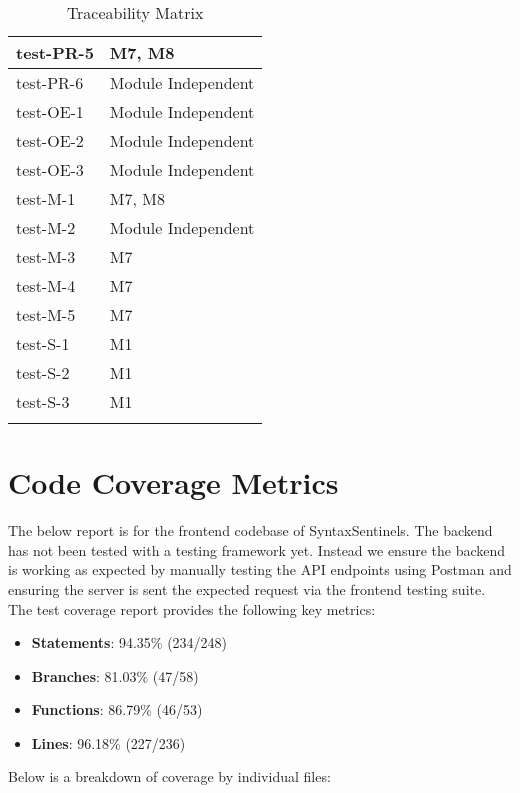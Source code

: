 \documentclass[12pt, titlepage]{article}
\begin{document}
\begin{center}
\begin{longtable}{|>{\centering\arraybackslash}p{4cm}|>{\centering\arraybackslash}p{10cm}|}
    test-PR-5 &  M7, M8\\
    \hline
    test-PR-6 &  Module Independent\\
    \hline
    test-OE-1 & Module Independent\\
    \hline
    test-OE-2 & Module Independent\\
    \hline
    test-OE-3 & Module Independent\\
    \hline
    test-M-1 & M7, M8 \\
    \hline
    test-M-2 & Module Independent\\
    \hline
    test-M-3 & M7 \\
    \hline
    test-M-4 & M7 \\
    \hline
    test-M-5 & M7 \\
    \hline
    test-S-1 & M1 \\
    \hline
    test-S-2 & M1 \\
    \hline
    test-S-3 & M1 \\
    \hline
  
    \caption{Traceability Matrix}
    \end{longtable}
    \end{center}

\section{Code Coverage Metrics}

The below report is for the frontend codebase of SyntaxSentinels. The backend has not been tested with a testing framework yet.
Instead we ensure the backend is working as expected by manually testing the API endpoints using Postman and ensuring the server is sent the 
expected request via the frontend testing suite. \\

The test coverage report provides the following key metrics:

\begin{itemize}
\item \textbf{Statements}: 94.35\% (234/248)
\item \textbf{Branches}: 81.03\% (47/58)
\item \textbf{Functions}: 86.79\% (46/53)
\item \textbf{Lines}: 96.18\% (227/236)
\end{itemize}

\newpage

Below is a breakdown of coverage by individual files:
\end{document}
